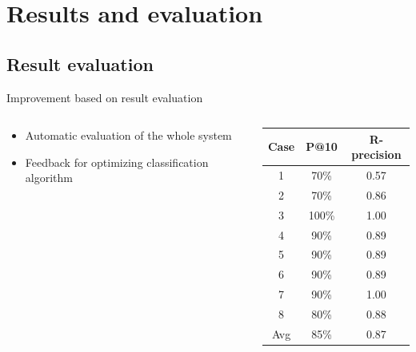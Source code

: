 \documentclass[screen, compress]{beamer}
\begin{document}
\section{Results and evaluation}

\subsection{Result evaluation}
\begin{frame}{Improvement based on result evaluation} %
\begin{columns}
\begin{column}[l]{6cm}
{ \Large
\begin{itemize}
	\item Automatic evaluation of the whole system
	\item Feedback for optimizing classification algorithm
\end{itemize}
}
\end{column}

\begin{column}[r]{5cm}
\begin{table}
\begin{tabular}{c c c}
    \toprule
    Case & P@10 & R-precision \\
    \midrule
	1 & 70\% & 0.57 \\
	2 & 70\% & 0.86 \\
	3 & 100\% & 1.00 \\
	4 & 90\% & 0.89 \\
	5 & 90\% & 0.89 \\
	6 & 90\% & 0.89 \\
	7 & 90\% & 1.00 \\
	8 & 80\% & 0.88 \\
    \midrule
	Avg & 85\% & 0.87 \\
	\bottomrule
\end{tabular}
\end{table}
\end{column}
\end{columns}
\end{frame}

\end{document}
